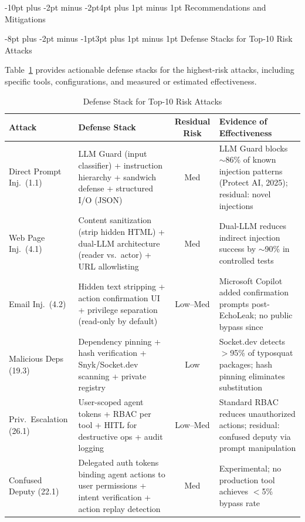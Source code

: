\documentclass[conference]{IEEEtran}
\makeatletter
\renewcommand{\section}{\@startsection{section}{1}{\z@}%
  {-10pt plus -2pt minus -2pt}{4pt plus 1pt minus 1pt}%
  {\normalfont\large\bfseries\sffamily\color{accentdark}}}
\renewcommand{\subsection}{\@startsection{subsection}{2}{\z@}%
  {-8pt plus -2pt minus -1pt}{3pt plus 1pt minus 1pt}%
  {\normalfont\normalsize\bfseries\sffamily\color{accentblue}}}
\newcommand{\tableheaderrow}{\rowcolor{accentblue}}
\renewcommand{\thead}[1]{\textbf{\color{white}\sffamily #1}}
\makeatother
\begin{document}
\section{Recommendations and Mitigations}\label{sec:recommendations}


\subsection{Defense Stacks for Top-10 Risk Attacks}

Table~\ref{tab:defense_stack} provides actionable defense stacks for the highest-risk attacks, including specific tools, configurations, and measured or estimated effectiveness.

\begin{table}[!htbp]
\centering
\caption{Defense Stack for Top-10 Risk Attacks}
\label{tab:defense_stack}
\renewcommand{\arraystretch}{1.15}
\scriptsize\sffamily
\begin{tabular}{p{1.8cm}p{4.5cm}cp{4.5cm}}
\toprule
\tableheaderrow \thead{Attack} & \thead{Defense Stack} & \thead{Residual Risk} & \thead{Evidence of Effectiveness} \\
\midrule
Direct Prompt Inj.\ (1.1) & LLM Guard (input classifier) + instruction hierarchy + sandwich defense + structured I/O (JSON) & Med & LLM Guard blocks $\sim$86\% of known injection patterns (Protect AI, 2025); residual: novel injections \\
\midrule
Web Page Inj.\ (4.1) & Content sanitization (strip hidden HTML) + dual-LLM architecture (reader vs.\ actor) + URL allowlisting & Med & Dual-LLM reduces indirect injection success by $\sim$90\% in controlled tests \\
\midrule
Email Inj.\ (4.2) & Hidden text stripping + action confirmation UI + privilege separation (read-only by default) & Low--Med & Microsoft Copilot added confirmation prompts post-EchoLeak; no public bypass since \\
\midrule
Malicious Deps (19.3) & Dependency pinning + hash verification + Snyk/Socket.dev scanning + private registry & Low & Socket.dev detects $>$95\% of typosquat packages; hash pinning eliminates substitution \\
\midrule
Priv.\ Escalation (26.1) & User-scoped agent tokens + RBAC per tool + HITL for destructive ops + audit logging & Low--Med & Standard RBAC reduces unauthorized actions; residual: confused deputy via prompt manipulation \\
\midrule
Confused Deputy (22.1) & Delegated auth tokens binding agent actions to user permissions + intent verification + action replay detection & Med & Experimental; no production tool achieves $<$5\% bypass rate \\

\end{tabular}
\end{table}
\end{document}
